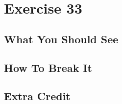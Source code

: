 \chapter{Exercise 33}


\section{What You Should See}


\section{How To Break It}


\section{Extra Credit}



